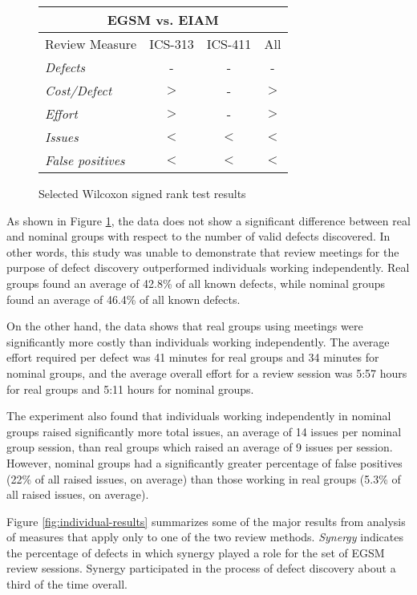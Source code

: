 \begin{figure}[ht]
  \small
  \begin{center}
  \begin{tabular}{|l|c|c|c|}
  \multicolumn{4}{c}{EGSM vs. EIAM}\\
   \hline
Review Measure    & ICS-313 & ICS-411 & All \\
   \hline
{\em Defects}         & -       & -       & - \\
{\em Cost/Defect}     & $>$     & -       & $>$ \\  
{\em Effort}          & $>$     & -       & $>$ \\
{\em Issues}          & $<$     & $<$     & $<$ \\
{\em False positives} & $<$     & $<$     & $<$ \\
  \hline
   \end{tabular}
  \end{center}
 \caption{Selected Wilcoxon signed rank test results}
 \label{fig:wilcoxon-results}
\normalsize
\end{figure}


As shown in Figure \ref{fig:wilcoxon-results}, the data does not show a
significant difference between real and nominal groups with respect to the
number of valid defects discovered. In other words, this study was unable
to demonstrate that review meetings for the purpose of defect discovery
outperformed individuals working independently.  Real groups found an
average of 42.8\% of all known defects, while nominal groups found an
average of 46.4\% of all known defects.

On the other hand, the data shows that real groups using meetings were
significantly more costly than individuals working independently.  The
average effort required per defect was 41 minutes for real groups and 34
minutes for nominal groups, and the average overall effort for a review
session was 5:57 hours for real groups and 5:11 hours for nominal groups.

The experiment also found that individuals working independently in nominal groups
raised significantly more total issues, an average of 14 issues per nominal
group session, than real groups which raised an average of 9 issues per
session.  However, nominal groups had a significantly greater percentage of
false positives (22\% of all raised issues, on average) than those working
in real groups (5.3\% of all raised issues, on average). 

Figure \ref{fig:individual-results} summarizes some of the major results from
analysis of measures that apply only to one of the two review methods.
{\em Synergy} indicates the percentage of defects in which
synergy played a role for the set of EGSM review sessions. 
Synergy participated in the process of defect discovery about a third
of the time overall. 

